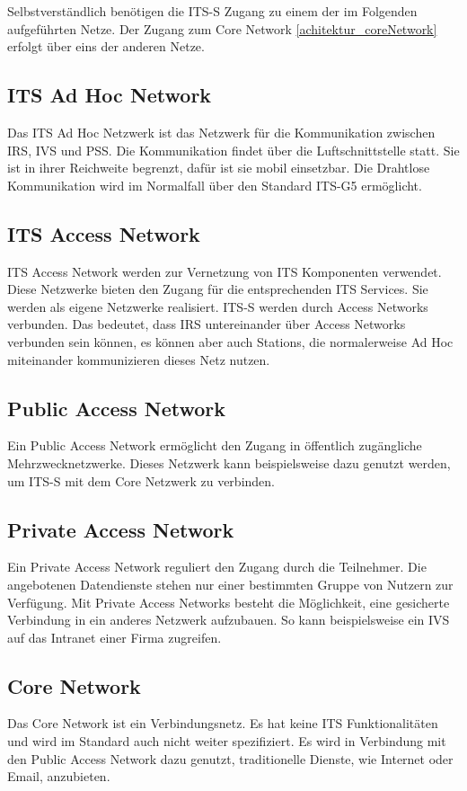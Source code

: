 Selbstverständlich benötigen die \ac{ITS-S} Zugang zu einem der im Folgenden aufgeführten Netze. Der Zugang zum Core Network \ref{achitektur_coreNetwork} erfolgt über eins der anderen Netze. 

\subsection{ITS Ad Hoc Network\label{achitektur_adHocNetwork}}
Das \ac{ITS} Ad Hoc Netzwerk ist das Netzwerk für die Kommunikation zwischen \ac{IRS}, \ac{IVS} und \ac{PSS}. Die Kommunikation findet über die Luftschnittstelle statt. Sie ist in ihrer Reichweite begrenzt, dafür ist sie mobil einsetzbar. Die Drahtlose Kommunikation wird im Normalfall über den Standard ITS-G5 ermöglicht.


\subsection{ITS Access Network \label{architektur_itsAccessNetwork}}
ITS Access Network werden zur Vernetzung von \ac{ITS} Komponenten verwendet. Diese Netzwerke bieten den Zugang für die entsprechenden \ac{ITS} Services. Sie werden als eigene Netzwerke realisiert. \ac{ITS-S} werden durch Access Networks verbunden. Das bedeutet, dass \ac{IRS} untereinander über Access Networks verbunden sein können, es können aber auch Stations, die normalerweise Ad Hoc miteinander kommunizieren dieses Netz nutzen. 

\subsection{Public Access Network}
Ein Public Access Network ermöglicht den Zugang in öffentlich zugängliche Mehrzwecknetzwerke. Dieses Netzwerk kann beispielsweise dazu genutzt werden, um \ac{ITS-S} mit dem Core Netzwerk zu verbinden. 

\subsection{Private Access Network}
Ein Private Access Network reguliert den Zugang durch die Teilnehmer. Die angebotenen Datendienste stehen nur einer bestimmten Gruppe von Nutzern zur Verfügung. Mit Private Access Networks besteht die Möglichkeit, eine gesicherte Verbindung in ein anderes Netzwerk aufzubauen. So kann beispielsweise ein \ac{IVS} auf das Intranet einer Firma zugreifen. 

\subsection{Core Network \label{achitektur_coreNetwork}}
Das Core Network ist ein Verbindungsnetz. Es hat keine \ac{ITS} Funktionalitäten und wird im Standard auch nicht weiter spezifiziert. Es wird in Verbindung mit den Public Access Network dazu genutzt, traditionelle Dienste, wie Internet oder Email, anzubieten.
 
